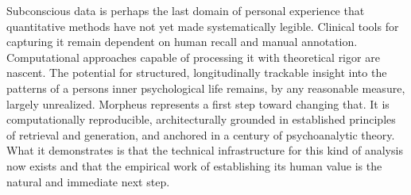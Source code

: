 \documentclass[12pt,a4paper]{report}
\begin{document}
Subconscious data is perhaps the last domain of personal experience that quantitative methods have not yet made systematically legible. Clinical tools for capturing it remain dependent on human recall and manual annotation. Computational approaches capable of processing it with theoretical rigor are nascent. The potential for structured, longitudinally trackable insight into the patterns of a person\textquotesingle{}s inner psychological life remains, by any reasonable measure, largely unrealized. Morpheus represents a first step toward changing that. It is computationally reproducible, architecturally grounded in established principles of retrieval and generation, and anchored in a century of psychoanalytic theory. What it demonstrates is that the technical infrastructure for this kind of analysis now exists and that the empirical work of establishing its human value is the natural and immediate next step.
\end{document}
